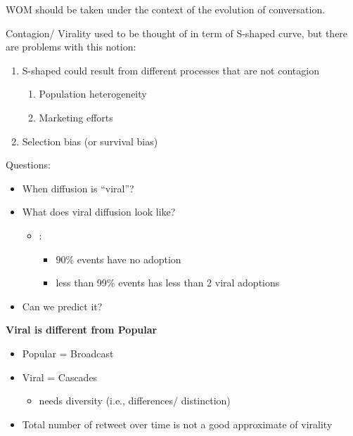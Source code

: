 \documentclass[
]{book}
\providecommand{\tightlist}{%
  \setlength{\itemsep}{0pt}\setlength{\parskip}{0pt}}
\begin{document}
WOM should be taken under the context of the evolution of conversation. \citep{Berger_2014}

Contagion/ Virality used to be thought of in term of S-shaped curve, but there are problems with this notion:

\begin{enumerate}
\def\labelenumi{\arabic{enumi}.}
\item
  S-shaped could result from different processes that are not contagion

  \begin{enumerate}
  \def\labelenumii{\arabic{enumii}.}
  \item
    Population heterogeneity \citep{Chatterjee_1990}
  \item
    Marketing efforts \citep{Van_den_Bulte_2001}
  \end{enumerate}
\item
  Selection bias (or survival bias)
\end{enumerate}

Questions:

\begin{itemize}
\item
  When diffusion is ``viral''?
\item
  What does viral diffusion look like?

  \begin{itemize}
  \item
    \citep{Goel_2012}:

    \begin{itemize}
    \item
      90\% events have no adoption
    \item
      less than 99\% events has less than 2 viral adoptions
    \end{itemize}
  \end{itemize}
\item
  Can we predict it?
\end{itemize}

\textbf{Viral is different from Popular} \citep{Goel_2015}

\begin{itemize}
\item
  Popular = Broadcast
\item
  Viral = Cascades

  \begin{itemize}
  \tightlist
  \item
    needs diversity (i.e., differences/ distinction)
  \end{itemize}
\item
  Total number of retweet over time is not a good approximate of virality
\end{itemize}
\end{document}
